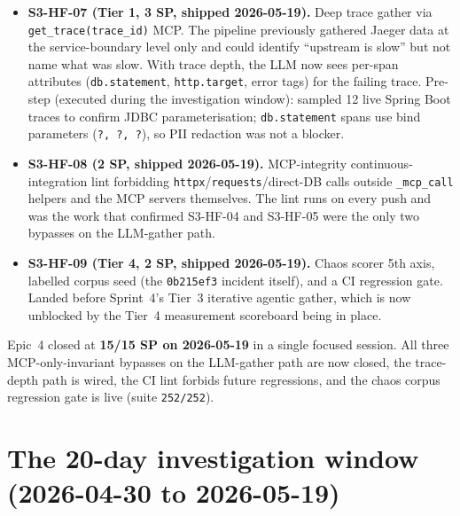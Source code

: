 \documentclass[11pt,a4paper,oneside]{report}
\begin{document}
\begin{itemize}
        \texttt{get\_low\_rated\_examples\_for\_alert}.  Eight new
        MCP-level tests cover the rating-filter semantics.
  \item \textbf{S3-HF-07 (Tier 1, 3 SP, shipped 2026-05-19).}  Deep
        trace gather via \texttt{get\_trace(trace\_id)} MCP.  The
        pipeline previously gathered Jaeger data at the
        service-boundary level only and could identify ``upstream is
        slow'' but not name what was slow.  With trace depth, the LLM
        now sees per-span attributes (\texttt{db.statement},
        \texttt{http.target}, error tags) for the failing trace.
        Pre-step (executed during the investigation window): sampled
        12 live Spring Boot traces to confirm JDBC parameterisation;
        \texttt{db.statement} spans use bind parameters
        (\texttt{?,\,?,\,?}), so PII redaction was not a blocker.
  \item \textbf{S3-HF-08 (2 SP, shipped 2026-05-19).}
        MCP-integrity continuous-integration lint forbidding
        \texttt{httpx}/\texttt{requests}/direct-DB calls outside
        \texttt{\_mcp\_call} helpers and the MCP servers themselves.
        The lint runs on every push and was the work that confirmed
        S3-HF-04 and S3-HF-05 were the only two bypasses on the
        LLM-gather path.
  \item \textbf{S3-HF-09 (Tier 4, 2 SP, shipped 2026-05-19).}  Chaos
        scorer 5th axis, labelled corpus seed (the \texttt{0b215ef3}
        incident itself), and a CI regression gate.  Landed before
        Sprint~4's Tier~3 iterative agentic gather, which is now
        unblocked by the Tier~4 measurement scoreboard being in
        place.
\end{itemize}

Epic~4 closed at \textbf{15/15 SP on 2026-05-19} in a single focused
session.  All three MCP-only-invariant bypasses on the
LLM-gather path are now closed, the trace-depth path is wired, the CI
lint forbids future regressions, and the chaos corpus regression gate
is live (suite \texttt{252/252}).

\section{The 20-day investigation window (2026-04-30 to 2026-05-19)}
\label{sec:investigation}
\end{document}
